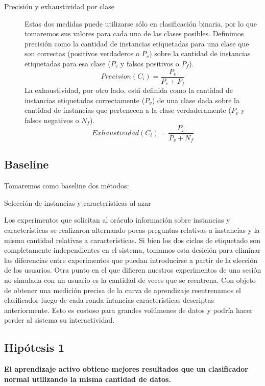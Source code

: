 \begin{description}
    \item [Precisión y exhaustividad por clase] Estas dos medidas puede utilizarse sólo en clasificación binaria, por lo que tomaremos sus valores para cada una de las clases posibles. Definimos precisión como la cantidad de instancias etiquetadas para una clase que son correctas (positivos verdaderos o $P_v$) sobre la cantidad de instancias etiquetadas para esa clase ($P_v$ y falsos positivos o $P_f$).
    $$Precision(C_i) = \frac{P_v}{P_v + P_f}$$
    La exhaustividad, por otro lado, está definida como la cantidad de instancias etiquetadas correctamente ($P_v$) de una clase dada sobre la cantidad de instancias que pertenecen a la clase verdaderamente ($P_v$ y falsos negativos o $N_f$).
    $$Exhaustividad(C_i) = \frac{P_v}{P_v + N_f}$$
\end{description}

\subsection{Baseline}
Tomaremos como baseline dos métodos:
\begin{description}
    \item[Selección de instancias y características al azar]
\end{description}

Los experimentos que solicitan al oráculo información sobre instancias y características se realizaron alternando pocas preguntas relativas a instancias y la misma cantidad relativas a características. Si bien los dos ciclos de etiquetado son completamente independientes en el sistema, tomamos esta desición para eliminar las diferencias entre experimentos que puedan introducirse a partir de la elección de los usuarios. Otra punto en el que difieren nuestros experimentos de una sesión no simulada con un usuario es la cantidad de veces que se reentrena. Con objeto de obtener una medición precisa de la curva de aprendizaje reentrenamos el clasificador luego de cada ronda intancias-características descriptas anteriormente. Esto es
costoso para grandes volúmenes de datos y podría hacer perder al sistema su interactividad.

\subsection{Hipótesis 1}
\textbf{El aprendizaje activo obtiene mejores resultados que un clasificador normal utilizando la misma cantidad de datos.}

